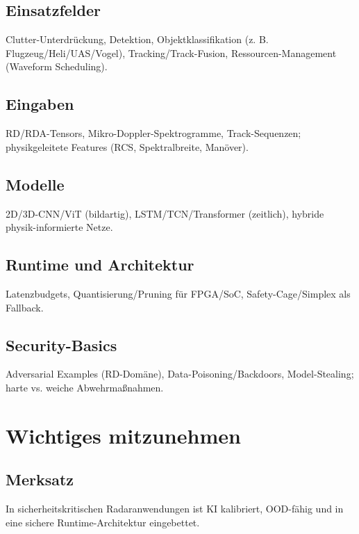 \subsection{Einsatzfelder}
Clutter-Unterdrückung, Detektion, Objektklassifikation (z. B. Flugzeug/Heli/UAS/Vogel), 
Tracking/Track-Fusion, Ressourcen-Management (Waveform Scheduling).

\subsection{Eingaben}
RD/RDA-Tensors, Mikro-Doppler-Spektrogramme, Track-Sequenzen; 
physikgeleitete Features (RCS, Spektralbreite, Manöver).

\subsection{Modelle}
2D/3D-CNN/ViT (bildartig), LSTM/TCN/Transformer (zeitlich), hybride physik-informierte Netze.

\subsection{Runtime und Architektur}
Latenzbudgets, Quantisierung/Pruning für FPGA/SoC, Safety-Cage/Simplex als Fallback.

\subsection{Security-Basics}
Adversarial Examples (RD-Domäne), Data-Poisoning/Backdoors, Model-Stealing; 
harte vs. weiche Abwehrmaßnahmen.




\section{Wichtiges mitzunehmen}
\subsection{Merksatz}
In sicherheitskritischen Radaranwendungen ist KI kalibriert, OOD-fähig und in eine sichere Runtime-Architektur eingebettet.